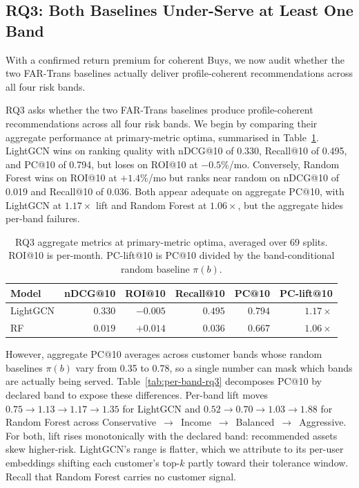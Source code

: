 \subsection{RQ3: Both Baselines Under-Serve at Least One Band}
\label{sec:results:rq3}

With a confirmed return premium for coherent Buys, we now audit whether the two FAR-Trans baselines actually deliver profile-coherent recommendations across all four risk bands.

RQ3 asks whether the two FAR-Trans baselines produce profile-coherent recommendations across all four risk bands. We begin by comparing their aggregate performance at primary-metric optima, summarised in Table~\ref{tab:rq3-aggregate}. LightGCN wins on ranking quality with nDCG@10 of 0.330, Recall@10 of 0.495, and PC@10 of 0.794, but loses on ROI@10 at $-0.5$\%/mo. Conversely, Random Forest wins on ROI@10 at $+1.4$\%/mo but ranks near random on nDCG@10 of 0.019 and Recall@10 of 0.036. Both appear adequate on aggregate PC@10, with LightGCN at $1.17\times$ lift and Random Forest at $1.06\times$, but the aggregate hides per-band failures.

\begin{table}[!t]
\centering
\small
\begin{tabular}{lrrrrr}
\toprule
Model & nDCG@10 & ROI@10 & Recall@10 & PC@10 & PC-lift@10 \\
\midrule
LightGCN      & $0.330$ & $-0.005$ & $0.495$ & $0.794$ & $1.17\times$ \\
RF            & $0.019$ & $+0.014$ & $0.036$ & $0.667$ & $1.06\times$ \\
\bottomrule
\end{tabular}
\caption{RQ3 aggregate metrics at primary-metric optima, averaged over 69 splits. ROI@10 is per-month. PC-lift@10 is PC@10 divided by the band-conditional random baseline $\pi(b)$.}
\label{tab:rq3-aggregate}
\end{table}

However, aggregate PC@10 averages across customer bands whose random baselines $\pi(b)$ vary from 0.35 to 0.78, so a single number can mask which bands are actually being served. Table~\ref{tab:per-band-rq3} decomposes PC@10 by declared band to expose these differences. Per-band lift moves $0.75 \to 1.13 \to 1.17 \to 1.35$ for LightGCN and $0.52 \to 0.70 \to 1.03 \to 1.88$ for Random Forest across Conservative~$\to$~Income~$\to$~Balanced~$\to$~Aggressive. For both, lift rises monotonically with the declared band: recommended assets skew higher-risk. LightGCN's range is flatter, which we attribute to its per-user embeddings shifting each customer's top-$k$ partly toward their tolerance window. Recall that Random Forest carries no customer signal.

